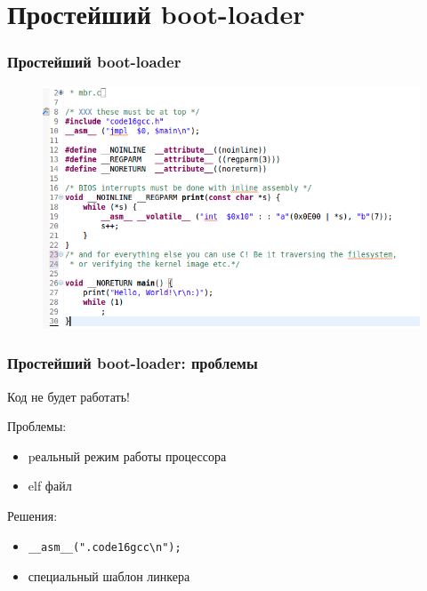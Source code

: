 \documentclass{beamer}
\begin{document}
\section{Простейший boot-loader}

\begin{frame}
\frametitle{Простейший boot-loader}

\begin{figure}
\includegraphics[scale=0.5]{res/mbrc}
\end{figure}

\end{frame}


\begin{frame}[fragile]
\frametitle{Простейший boot-loader: проблемы}
Код не будет работать!
\vspace{3em}
\pause

Проблемы:
\begin{itemize}
\item pеальный режим работы процессора
\item elf файл
\end{itemize}
\vspace{3em}
\pause

Решения:
\begin{itemize}
\item \begin{verbatim}__asm__(".code16gcc\n");\end{verbatim}
\item специальный шаблон линкера
\end{itemize}

\end{frame}
\end{document}
